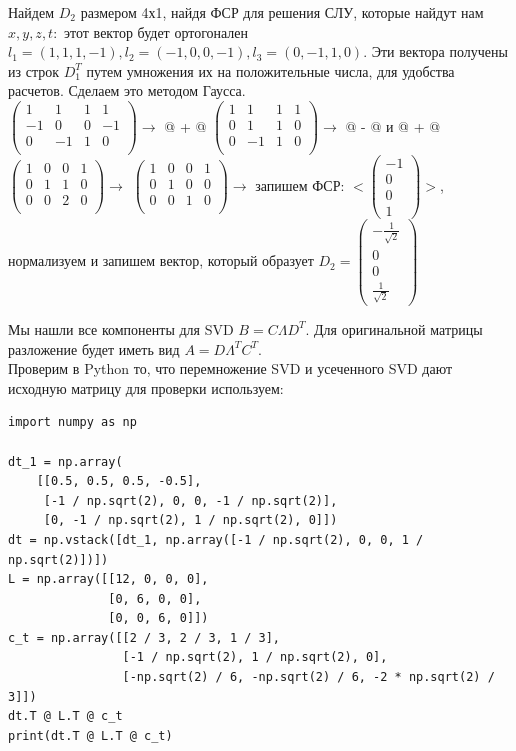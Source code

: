 \documentclass[a4paper,12pt]{article}
\makeatletter
\newcommand*{\rom}[1]{\expandafter\@slowromancap\romannumeral #1@}
\newcounter{z}
\makeatother
\begin{document}
\begin{enumerate}
Найдем $D_2$ размером 4х1, найдя ФСР для решения СЛУ, которые найдут нам $x,y,z,t:$ этот вектор будет ортогонален $l_1 = (1, 1,1,-1), l_2=(-1,0,0,-1), l_3= (0,-1,1,0)$. Эти вектора получены из строк $D_1^{T}$ путем умножения их на положительные числа, для удобства расчетов. Сделаем это методом Гаусса.\\
$\begin{pmatrix}
1&1&1&1\\
-1&0&0&-1\\
0&-1&1&0\\
\end{pmatrix} \rightarrow$ \rom{2} +  \rom{1}
$\begin{pmatrix}
1&1&1&1\\
0&1&1&0\\
0&-1&1&0\\
\end{pmatrix} \rightarrow$ \rom{1} - \rom{2} и \rom{3} + \rom{2}
$\begin{pmatrix}
1&0&0&1\\
0&1&1&0\\
0&0&2&0\\
\end{pmatrix} \rightarrow$ $\begin{pmatrix}
1&0&0&1\\
0&1&0&0\\
0&0&1&0\\
\end{pmatrix} \rightarrow$ запишем ФСР: $<\begin{pmatrix}
-1\\
0\\
0\\
1
\end{pmatrix}>$, нормализуем и запишем вектор, который образует $D_2= \begin{pmatrix}
-\frac{1}{\sqrt{2}}\\
0\\
0\\
\frac{1}{\sqrt{2}}
\end{pmatrix}$

Мы нашли все компоненты для SVD $B=C\Lambda D^T$. Для оригинальной матрицы разложение будет иметь вид $A = D \Lambda^T C^T$.\\
Проверим в Python то, что перемножение SVD и усеченного SVD дают исходную матрицу для проверки используем:

\begin{verbatim}
import numpy as np

dt_1 = np.array(
    [[0.5, 0.5, 0.5, -0.5],
     [-1 / np.sqrt(2), 0, 0, -1 / np.sqrt(2)],
     [0, -1 / np.sqrt(2), 1 / np.sqrt(2), 0]])
dt = np.vstack([dt_1, np.array([-1 / np.sqrt(2), 0, 0, 1 / np.sqrt(2)])])
L = np.array([[12, 0, 0, 0],
              [0, 6, 0, 0],
              [0, 0, 6, 0]])
c_t = np.array([[2 / 3, 2 / 3, 1 / 3],
                [-1 / np.sqrt(2), 1 / np.sqrt(2), 0],
                [-np.sqrt(2) / 6, -np.sqrt(2) / 6, -2 * np.sqrt(2) / 3]])
dt.T @ L.T @ c_t
print(dt.T @ L.T @ c_t)


\end{verbatim}
\end{enumerate}
\end{document}
